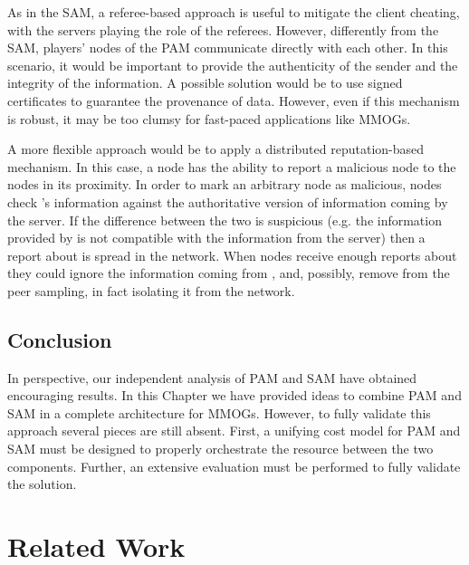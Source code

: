 \documentclass[final,10pt,a5paper]{phdimt}
\theoremstyle{definition}
\begin{document}
As in the SAM, a referee-based approach is useful to mitigate the client cheating, with the servers playing the role of the referees.
However, differently from the SAM, players' nodes of the PAM communicate directly with each other.
In this scenario, it would be important to provide the authenticity of the sender and the integrity of the information.
A possible solution would be to use signed certificates to guarantee the provenance of data.
However, even if this mechanism is robust, it may be too clumsy for fast-paced applications like MMOGs.


A more flexible approach would be to apply a distributed reputation-based mechanism.
In this case, a node has the ability to report a malicious node to the nodes in its proximity.
In order to mark an arbitrary node  as malicious, nodes check 's information against the authoritative version of information coming by the server. If the difference between the two is suspicious (e.g. the information provided by  is not compatible with the information from the server) then a report about  is spread in the network.
When nodes receive enough reports about  they could ignore the information coming from , and, possibly, remove  from the peer sampling, in fact isolating it from the network.

\section{Conclusion}


In perspective, our independent analysis of PAM and SAM have obtained encouraging results.
In this Chapter we have provided ideas to combine PAM and SAM in a complete architecture for MMOGs.
However, to fully validate this approach several pieces are still absent.
First, a unifying cost model for PAM and SAM must be designed to properly orchestrate the resource between the two components. Further, an extensive evaluation must be performed to fully validate the solution.














\clearpage{}
\clearpage{}
\chapter{Related Work}
\label{chap:related}
\end{document}

